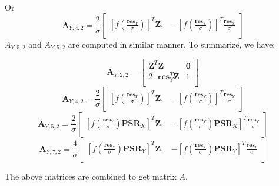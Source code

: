\documentclass[]{article}
\begin{document}
Or
\[
\pmb{A}_{Y,4,2} = \frac{2}{\sigma}\begin{bmatrix}
   \left[f\left(\frac{\pmb{res}_Y}{\sigma}\right)\right]^T \pmb{Z}, &
   -\left[f\left(\frac{\pmb{res}_Y}{\sigma}\right)\right]^T \frac{\pmb{res}_Y}{\sigma} \\
\end{bmatrix}
\]
$A_{Y,5,2}$ and  $A_{Y,5,2}$ are computed in similar manner. To summarize, we have:

\[
\pmb{A}_{Y,2,2} = 
\begin{bmatrix}
  \pmb{Z}^T\pmb{Z} & \pmb{0}\\
  2 \cdot \pmb{res}_Y^T\pmb{Z} & 1\\
  \end{bmatrix}
\]
\[
\pmb{A}_{Y,4,2} = \frac{2}{\sigma}\begin{bmatrix}
   \left[f\left(\frac{\pmb{res}_Y}{\sigma}\right)\right]^T \pmb{Z}, &
   -\left[f\left(\frac{\pmb{res}_Y}{\sigma}\right)\right]^T \frac{\pmb{res}_Y}{\sigma} \\
\end{bmatrix}
\]
\[
\pmb{A}_{Y,5,2} = \frac{2}{\sigma}\begin{bmatrix}
   \left[f\left(\frac{\pmb{res}_Y}{\sigma}\right)\pmb{PSR}_X\right]^T \pmb{Z}, &
   -\left[f\left(\frac{\pmb{res}_Y}{\sigma}\right)\pmb{PSR}_X\right]^T \frac{\pmb{res}_Y}{\sigma} \\
\end{bmatrix}
\]
\[
\pmb{A}_{Y,7,2} = \frac{4}{\sigma}\begin{bmatrix}
   \left[f\left(\frac{\pmb{res}_Y}{\sigma}\right)\pmb{PSR}_Y\right]^T \pmb{Z}, &
   -\left[f\left(\frac{\pmb{res}_Y}{\sigma}\right)\pmb{PSR}_Y\right]^T \frac{\pmb{res}_Y}{\sigma} \\
\end{bmatrix}
\]

The above matrices are combined to get matrix $A$.
\end{document}
